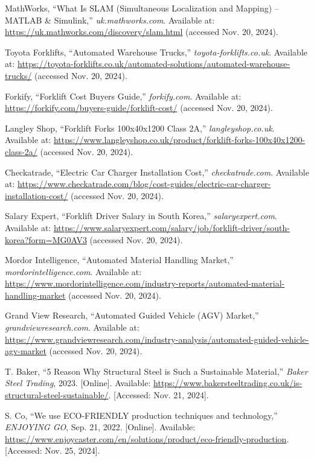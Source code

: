 \documentclass[12pt]{article}
\begin{document}
\begin{thebibliography}{99}
\footnotesize

MathWorks, “What Is SLAM (Simultaneous Localization and Mapping) – MATLAB \& Simulink,” \textit{uk.mathworks.com}.  
Available at: \url{https://uk.mathworks.com/discovery/slam.html} (accessed Nov. 20, 2024).
 

Toyota Forklifts, “Automated Warehouse Trucks,” \textit{toyota-forklifts.co.uk}.  
Available at: \url{https://toyota-forklifts.co.uk/automated-solutions/automated-warehouse-trucks/} (accessed Nov. 20, 2024).

Forkify, “Forklift Cost Buyers Guide,” \textit{forkify.com}.  
Available at: \url{https://forkify.com/buyers-guide/forklift-cost/} (accessed Nov. 20, 2024).


Langley Shop, “Forklift Forks 100x40x1200 Class 2A,” \textit{langleyshop.co.uk}.  
Available at: \url{https://www.langleyshop.co.uk/product/forklift-forks-100x40x1200-class-2a/} (accessed Nov. 20, 2024).

Checkatrade, “Electric Car Charger Installation Cost,” \textit{checkatrade.com}.  
Available at: \url{https://www.checkatrade.com/blog/cost-guides/electric-car-charger-installation-cost/} (accessed Nov. 20, 2024).

Salary Expert, “Forklift Driver Salary in South Korea,” \textit{salaryexpert.com}.  
Available at: \url{https://www.salaryexpert.com/salary/job/forklift-driver/south-korea?form=MG0AV3} (accessed Nov. 20, 2024).

Mordor Intelligence, “Automated Material Handling Market,” \textit{mordorintelligence.com}.  
Available at: \url{https://www.mordorintelligence.com/industry-reports/automated-material-handling-market} (accessed Nov. 20, 2024).

Grand View Research, “Automated Guided Vehicle (AGV) Market,” \textit{grandviewresearch.com}.  
Available at: \url{https://www.grandviewresearch.com/industry-analysis/automated-guided-vehicle-agv-market} (accessed Nov. 20, 2024).

 T. Baker, ``5 Reason Why Structural Steel is Such a Sustainable Material,'' \textit{Baker Steel Trading}, 2023. [Online]. Available: \url{https://www.bakersteeltrading.co.uk/is-structural-steel-sustainable/}. [Accessed: Nov. 21, 2024].

 S. Co, ``We use ECO-FRIENDLY production techniques and technology,'' \textit{ENJOYING GO}, Sep. 21, 2022. [Online]. Available: \url{https://www.enjoycaster.com/en/solutions/product/eco-friendly-production}. [Accessed: Nov. 25, 2024].


\end{thebibliography}
\end{document}

